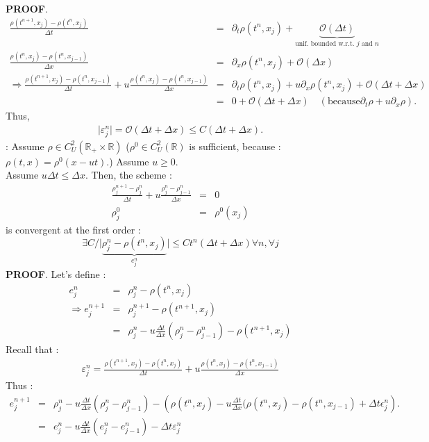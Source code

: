 \documentclass{report}
\newcommand{\R}{\ensuremath{\mathbb{R}}} %
\newcommand*{\theorem}[1]{\noindent\textbf{\color{purple}{#1}}}
\theoremstyle{plain}
\theoremstyle{definition}
\theoremstyle{remark}
\begin{document}
\textbf{PROOF}.
\begin{eqnarray*}
\frac{\rho(t^{n+1} ,x_{j}) - \rho(t^{n} , x_{j})}{\Delta t} &=& \partial_t  \rho(t^n, x_j) + \underbrace{\mathcal{O}(\Delta t)}_{\text{unif. bounded w.r.t. } j\text{ and }n} \\
\frac{\rho(t^{n} ,x_{j}) - \rho(t^{n} ,x_{j-1})}{\Delta x} &=& \partial_x \rho(t^n, x_j) + \mathcal{O}(\Delta x) \\
\Rightarrow \frac{\rho(t^{n+1} ,x_{j}) - \rho(t^{n} ,x_{j-1})}{\Delta t} 
+u\frac{\rho(t^{n} ,x_{j}) - \rho(t^{n} ,x_{j-1})}{\Delta x}   
&=& \partial_t \rho(t^n,x_j) + u \partial_x \rho(t^n,x_j) + \mathcal{O}(\Delta t + \Delta x) \\
&=& 0 + \mathcal{O}(\Delta t + \Delta x)\quad  (\text{because} \partial_t \rho + u \partial_x \rho).
\end{eqnarray*}
Thus, 
\begin{eqnarray*}
\vert \varepsilon^n_j \vert = \mathcal{O}(\Delta t + \Delta x)
\le  C (\Delta t + \Delta x). 
\end{eqnarray*}
\theorem{Theorem} : Assume $\rho \in C^2_U(\R_{+} \times \R)$
($\rho^0 \in C^2_U(\R)$ is sufficient, because : $\rho(t,x) =\rho^0(x-ut)$.)
Assume $u \ge 0$. \\
Assume $u\Delta t \le \Delta x$.
Then, the scheme : 
\begin{eqnarray}
\frac{\rho^{n+1}_{j} - \rho^{n}_{j}}{\Delta t} + u \frac{\rho^{n}_{j} - \rho^{n}_{j-1}}{\Delta x} &=& 0 \\
\rho^0_j &=& \rho^0(x_j)
\end{eqnarray}
is convergent at the first order :
\begin{equation}
\exists C / \vert \underbrace{\rho^n_j - \rho(t^n,x_j)}_{e_j^n}\vert \le C t^n (\Delta t + \Delta x) \forall n, \forall j
\end{equation}
\textbf{PROOF}. Let's define :
\begin{eqnarray}
e_j^n &=& \rho^n_j - \rho(t^n,x_j) \\
\Rightarrow e_j^{n+1} &=& \rho^{n+1}_j - \rho(t^{n+1},x_j) \\
&=& \rho^n_j - u \frac{\Delta t}{\Delta x}(\rho^n_j - \rho^n_{j-1}) - \rho(t^{n+1},x_j)
\end{eqnarray}
Recall that : 
\begin{eqnarray}
\varepsilon_j^n = \frac{\rho(t^{n+1},x_j)-\rho(t^n,x_j)}{\Delta t} + u \frac{\rho(t^{n},x_j)-\rho(t^n,x_{j-1})}{\Delta x} 
\end{eqnarray}
Thus : 
\begin{eqnarray}
e_j^{n+1} &=& \rho_j^n - u\frac{\Delta t}{\Delta x}\left(\rho_j^n - \rho^n_{j-1}\right) - \left(\rho(t^{n},x_j) -  u\frac{\Delta t}{\Delta x} (\rho(t^{n},x_j)-\rho(t^n,x_{j-1}) + \Delta t \epsilon^n_j \right). \\
&=& e^n_j - u\frac{\Delta t}{\Delta x} (e^n_j - e^n_{j-1}) - \Delta t \varepsilon^n_j
\end{eqnarray}
\end{document}
